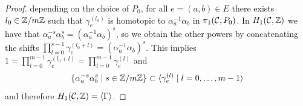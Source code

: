 \documentclass[main.tex]{subfiles}
\begin{document}
\begin{proof}
  depending on the choice of $P_0$, for all $e = (a,b) \in E$ there exists $l_0 \in \mathbb{Z}/m\mathbb{Z}$ such that $\gamma_e^{(l_0)}$ is homotopic to $\alpha_a^{-1} \alpha_b$ in $\pi_1(\mathcal{C},P_0)$.
   In $H_1(\mathcal{C},\mathbb{Z})$ we have that $\alpha_a^{-s}\alpha_b^{s} = ( \alpha_a^{-1}\alpha_b)^s$, so we obtain the other powers by concatenating
  the shifts $\prod_{l = 0}^{s-1} \gamma_e^{(l_0+l)} = (\alpha_a^{-1}\alpha_b)^s$.
  This implies $1 = \prod_{l = 0}^{m-1} \gamma_e^{(l_0+l)} = \prod_{l = 0}^{m-1} \gamma_e^{(l)}$ and
   $$\{  \alpha_a^{-s} \alpha_b^{s}  \mid  s \in \mathbb{Z}/m\mathbb{Z}  \} \subset  \langle  \gamma_e^{(l)} 
  \mid  l = 0,\dots,m-1 \rangle$$ and therefore $H_1(\mathcal{C},\mathbb{Z}) = \langle  \Gamma  \rangle$.

  \end{proof}
\end{document}
